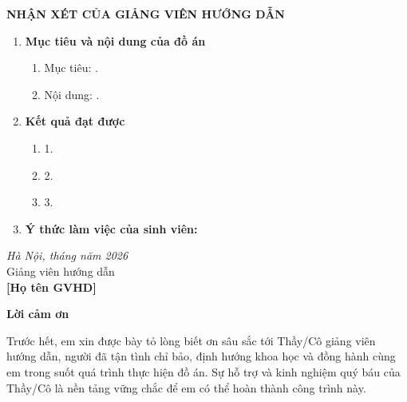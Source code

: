 \documentclass[oneside, a4paper]{book}
\theoremstyle{plain}
\theoremstyle{plain}
\theoremstyle{definition}
\theoremstyle{remark}
\begin{document}
	\newpage

	\newpage
	\setcounter{page}{1}
	\thisfancypage{
		\setlength{\fboxsep}{0.5cm}
		\fbox}{}

	\fontsize{13pt}{16pt}\selectfont
	\bigbreak
	\begin{center}
		{\bfseries NHẬN XÉT CỦA GIẢNG VIÊN HƯỚNG DẪN}
	\end{center}
	\bigbreak

	\fontsize{12pt}{14pt}\selectfont
	\begin{enumerate}
		\item [{\bfseries 1.}]{\bfseries Mục tiêu và nội dung của đồ án}
		\begin{enumerate}
			\item Mục tiêu: .
			\item Nội dung: .
		\end{enumerate}
		\item [{\bfseries 2.}] {\bfseries Kết quả đạt được}
		\begin{enumerate}
			\item 1.
			\item 2.
			\item 3.
		\end{enumerate}
		\item [{\bfseries 3.}]{\bfseries Ý thức làm việc của sinh viên:}
	\end{enumerate}
	\hspace{0.5\textwidth}
	\begin{minipage}{0.5\textwidth}
		\noindent\begin{center}
			\textit{Hà Nội, tháng \hspace{0.4cm} năm 2026} \\
			Giảng viên hướng dẫn\\ \vspace{2cm}
			\textbf{[Họ tên GVHD]}
		\end{center}
	\end{minipage}

	\newpage

\fontsize{22pt}{16pt}\selectfont
{\bfseries Lời cảm ơn}
\fontsize{13pt}{16pt}\selectfont
\bigskip

Trước hết, em xin được bày tỏ lòng biết ơn sâu sắc tới Thầy/Cô giảng viên hướng dẫn, người đã tận tình chỉ bảo, định hướng khoa học và đồng hành cùng em trong suốt quá trình thực hiện đồ án. Sự hỗ trợ và kinh nghiệm quý báu của Thầy/Cô là nền tảng vững chắc để em có thể hoàn thành công trình này.
\end{document}
